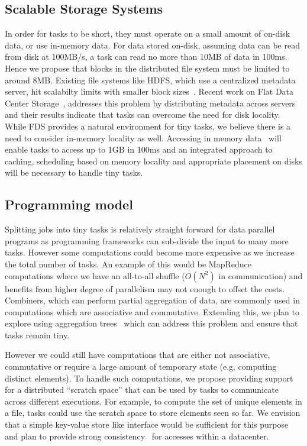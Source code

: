 \subsection{Scalable Storage Systems}
In order for tasks to be short, they must operate on a small amount of on-disk
data, or use in-memory data.  For data stored on-disk, assuming data can be read
from disk at 100MB/s, a task can read no more than 10MB of data in 100ms.  Hence
we propose that blocks in the distributed file system must be limited to around
8MB. Existing file systems like HDFS, which use a centralized metadata server,
hit scalabilty limits with smaller block sizes~\cite{facebook-berkeley-talk}.
Recent work on Flat Data Center Storage~\cite{fds}, addresses this problem by
distributing metadata across servers and their results indicate that tasks can
overcome the need for disk locality. While FDS provides a natural environment
for tiny tasks, we believe there is a need to consider in-memory locality as
well. Accessing in memory data~\cite{pacman, spark} will enable tasks to access 
up to 1GB in 100ms and an integrated approach to caching, scheduling based on
memory locality and appropriate placement on disks will be necessary to handle
tiny tasks.

\subsection{Programming model}
\label{sec:prog}
Splitting jobs into tiny tasks is relatively straight forward for data parallel
programs as programming frameworks can sub-divide the input to many more tasks.
However some computations could become more expensive as we increase the total
number of tasks. An example of this would be MapReduce computations where we
have an all-to-all shuffle ($O(N^2)$ in communication) and benefits from higher
degree of parallelism may not enough to offset the costs. Combiners, which can
perform partial aggregation of data, are commonly used in computations which are
associative and commutative. Extending this, we plan to explore using
aggregation trees~\cite{something} which can address this problem and ensure
that tasks remain tiny.

However we could still have computations that are either not associative,
commutative or require a large amount of temporary state (e.g. computing
distinct elements). To handle such computations, we propose providing 
support for a distributed ``scratch space'' that can be used by tasks to 
communicate across different executions. For example, to compute the set of
unique elements in a file, tasks could use the scratch space to store elements
seen so far. We envision that a simple key-value store like interface would
be sufficient for this purpose and plan to provide strong 
consistency~\cite{something} for accesses within a datacenter. 


